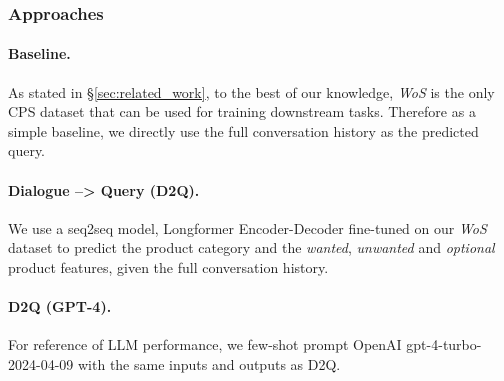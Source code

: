 \subsubsection{Approaches} \label{sec:conversational_query_generation_approaches}

\paragraph{Baseline.} As stated in \S\ref{sec:related_work}, to the best of our knowledge, \textit{WoS} is the only CPS dataset that can be used for training downstream tasks. Therefore as a simple baseline, we directly use the full conversation history as the predicted query.
\paragraph{Dialogue --> Query (D2Q).} We use a seq2seq model, Longformer Encoder-Decoder \citep[LED;][]{beltagy2020longformer} fine-tuned on our \textit{WoS} dataset to predict the product category and the \textit{wanted}, \textit{unwanted} and \textit{optional} product features, given the full conversation history.

\paragraph{D2Q (GPT-4).} For reference of LLM performance, we few-shot prompt OpenAI gpt-4-turbo-2024-04-09 with the same inputs and outputs as D2Q.

